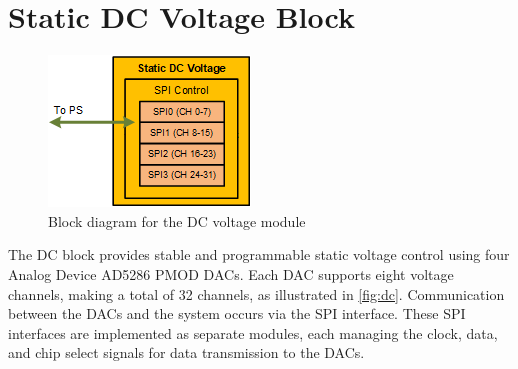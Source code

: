 

 

\section{Static DC Voltage Block}
\begin{figure}[ht]
    \setlength{\abovecaptionskip}{5pt}    %
    \setlength{\belowcaptionskip}{5pt}    %
    \centering
    \includegraphics[width=0.4\linewidth]{figures/5.2.png}
    \caption{Block diagram for the DC voltage module}
    \label{fig:dc}
\end{figure}
The DC block provides stable and programmable static voltage control using four Analog Device AD5286 PMOD DACs. Each DAC supports eight voltage channels, making a total of 32 channels, as illustrated in \autoref{fig:dc}. Communication between the DACs and the system occurs via the SPI interface. These SPI interfaces are implemented as separate modules, each managing the clock, data, and chip select signals for data transmission to the DACs.

